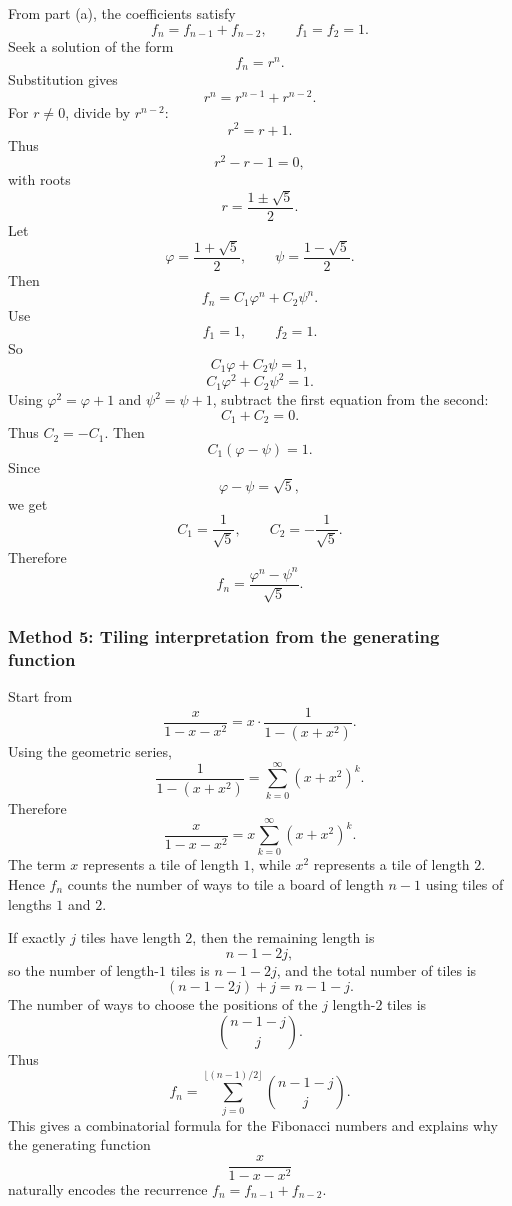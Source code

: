 \documentclass[12pt]{article}
\begin{document}
From part (a), the coefficients satisfy
\[
f_n=f_{n-1}+f_{n-2},\qquad f_1=f_2=1.
\]
Seek a solution of the form
\[
f_n=r^n.
\]
Substitution gives
\[
r^n=r^{n-1}+r^{n-2}.
\]
For \(r\ne0\), divide by \(r^{n-2}\):
\[
r^2=r+1.
\]
Thus
\[
r^2-r-1=0,
\]
with roots
\[
r=\frac{1\pm\sqrt5}{2}.
\]
Let
\[
\varphi=\frac{1+\sqrt5}{2},
\qquad
\psi=\frac{1-\sqrt5}{2}.
\]
Then
\[
f_n=C_1\varphi^n+C_2\psi^n.
\]
Use
\[
f_1=1,\qquad f_2=1.
\]
So
\[
C_1\varphi+C_2\psi=1,
\]
\[
C_1\varphi^2+C_2\psi^2=1.
\]
Using \(\varphi^2=\varphi+1\) and \(\psi^2=\psi+1\), subtract the first equation from
the second:
\[
C_1+C_2=0.
\]
Thus \(C_2=-C_1\). Then
\[
C_1(\varphi-\psi)=1.
\]
Since
\[
\varphi-\psi=\sqrt5,
\]
we get
\[
C_1=\frac1{\sqrt5},
\qquad
C_2=-\frac1{\sqrt5}.
\]
Therefore
\[
\boxed{
f_n=\frac{\varphi^n-\psi^n}{\sqrt5}.
}
\]

\newpage
\subsubsection{Method 5: Tiling interpretation from the generating function}

Start from
\[
\frac{x}{1-x-x^2}
=
x\cdot \frac1{1-(x+x^2)}.
\]
Using the geometric series,
\[
\frac1{1-(x+x^2)}
=
\sum_{k=0}^{\infty}(x+x^2)^k.
\]
Therefore
\[
\frac{x}{1-x-x^2}
=
x\sum_{k=0}^{\infty}(x+x^2)^k.
\]
The term \(x\) represents a tile of length \(1\), while \(x^2\) represents a tile of
length \(2\). Hence \(f_n\) counts the number of ways to tile a board of length \(n-1\)
using tiles of lengths \(1\) and \(2\).

If exactly \(j\) tiles have length \(2\), then the remaining length is
\[
n-1-2j,
\]
so the number of length-\(1\) tiles is \(n-1-2j\), and the total number of tiles is
\[
(n-1-2j)+j=n-1-j.
\]
The number of ways to choose the positions of the \(j\) length-\(2\) tiles is
\[
\binom{n-1-j}{j}.
\]
Thus
\[
\boxed{
f_n=
\sum_{j=0}^{\lfloor (n-1)/2\rfloor}
\binom{n-1-j}{j}.
}
\]
This gives a combinatorial formula for the Fibonacci numbers and explains why the
generating function
\[
\frac{x}{1-x-x^2}
\]
naturally encodes the recurrence \(f_n=f_{n-1}+f_{n-2}\).
\end{document}
